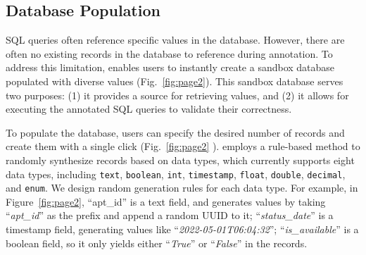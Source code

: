\subsection{Database Population}

SQL queries often reference specific values in the database. 
However, there are often no existing records in the database to reference during annotation. 
To address this limitation, {\tool} enables users to instantly create a sandbox database populated with diverse values (Fig.~\ref{fig:page2}). This sandbox database serves two purposes: (1) it provides a source for retrieving values, and (2) it allows for executing the annotated SQL queries to validate their correctness.


To populate the database, users can specify the desired number of records and create them with a single click (Fig.~\ref{fig:page2} ). 
{\tool} employs a rule-based method to randomly synthesize records based on data types, which currently supports eight data types, including \texttt{text}, \texttt{boolean}, \texttt{int}, \texttt{timestamp}, \texttt{float}, \texttt{double}, \texttt{decimal}, and \texttt{enum}.
We design random generation rules for each data type. 
For example, in Figure~\ref{fig:page2}, ``apt\_id'' is a text field, and {\tool} generates values by taking ``\textit{apt\_id}'' as the prefix and append a random UUID to it;
``\textit{status\_date}'' is a timestamp field, generating values like ``\textit{2022-05-01T06:04:32}'';
``\textit{is\_available}'' is a boolean field, so it only yields either ``\textit{True}'' or ``\textit{False}'' in the records. 


